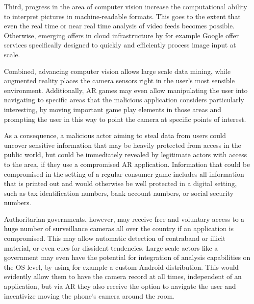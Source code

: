 Third, progress in the area of computer vision increase the computational ability to interpret pictures in machine-readable formats. This goes to the extent that even the real time or near real time analysis of video feeds becomes possible. Otherwise, emerging offers in cloud infrastructure by for example Google offer services specifically designed to quickly and efficiently process image input at scale.

Combined, advancing computer vision allows large scale data mining, while augmented reality places the camera sensors right in the user's most sensible environment.
Additionally, AR games may even allow manipulating the user into navigating to specific areas that the malicious application considers particularly interesting, by moving important game play elements in those areas and prompting the user in this way to point the camera at specific points of interest.

As a consequence, a malicious actor aiming to steal data from users could uncover sensitive information that may be heavily protected from access in the public world, but could be immediately revealed by legitimate actors with access to the area, if they use a compromised AR application.
Information that could be compromised in the setting of a regular consumer game includes all information that is printed out and would otherwise be well protected in a digital setting, such as tax identification numbers, bank account numbers, or social security numbers.

Authoritarian governments, however, may receive free and voluntary access to a huge number of surveillance cameras all over the country if an application is compromised. This may allow automatic detection of contraband or illicit material, or even cues for dissident tendencies. Large scale actors like a government may even have the potential for integration of analysis capabilities on the OS level, by using for example a custom Android distribution.
This would evidently allow them to have the camera record at all times, independent of an application, but via AR they also receive the option to navigate the user and incentivize moving the phone's camera around the room.

